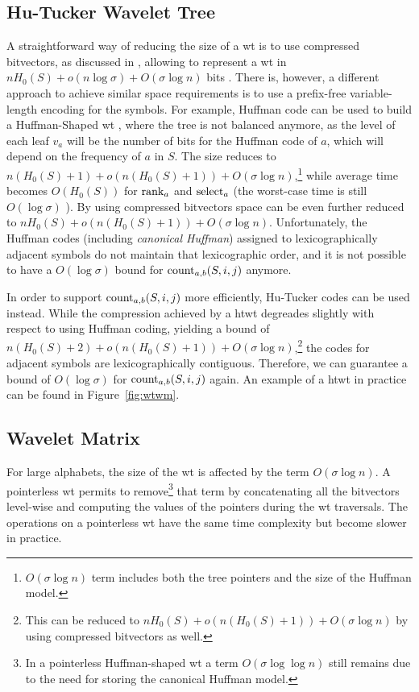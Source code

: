 \documentclass[a4paper,10pt,twoside]{book}
\begin{document}
    \subsection{Hu-Tucker Wavelet Tree}
    A straightforward way of reducing the size of a \gls{wt} is to use compressed bitvectors, as discussed in \cite{CNspire08.1}, allowing to represent a \gls{wt} in $nH_0(S) + o(n\log\sigma) + O(\sigma\log n)$ bits \cite{WT03}. There is, however, a different approach to achieve similar space requirements is to use a prefix-free variable-length encoding for the symbols.
    For example, Huffman code \cite{huffman1952method} can be used to build a
    Huffman-Shaped \gls{wt} \cite{ferragina2009compressed}, where the tree is not balanced
    anymore, as the level of each leaf $v_a$ will be the number of bits for the Huffman code of $a$, which will depend on the frequency of $a$ in $S$. The size reduces to $n(H_0(S)+1)+ o(n(H_0(S)+1)) +  O(\sigma \log n)$,\footnote{$O(\sigma \log n)$ term 
    includes both the tree pointers and the size of the Huffman model.} while average time becomes
    $O(H_0(S))$ for $\operatorname{rank}_a$ and $\operatorname{select}_a$  (the worst-case time is still $O(\log\sigma)$ 
    \cite{Barbay:2013:CPA:2562345.2562626}). By using compressed
    bitvectors \cite{CNspire08.1} space can be even further reduced to $nH_0(S) + o(n(H_0(S)+1)) +  O(\sigma \log n)$.
    Unfortunately, the Huffman codes (including \textit{canonical Huffman}) assigned to
    lexicographically adjacent symbols do not maintain that lexicographic order, and it is not possible to have a $O(\log\sigma)$ bound for $\operatorname{count}_{a,b}(S,i,j)$ anymore.
	
	In order to support $\operatorname{count}_{a,b}(S,i,j)$ more efficiently, Hu-Tucker codes \cite{hu1971optimal} can be used instead. While the compression achieved by a \gls{htwt} \cite{barbay2009compressed} degreades slightly with respect to using Huffman coding, yielding a bound of $n(H_0(S)+2) + o(n(H_0(S)+1)) +  O(\sigma \log n)$,\footnote{This can be reduced to  $nH_0(S) + o(n(H_0(S)+1)) +  O(\sigma \log n)$ by using compressed bitvectors as well.} the codes for adjacent symbols are lexicographically contiguous. Therefore, we can guarantee a bound of $O(\log\sigma)$ for $\operatorname{count}_{a,b}(S,i,j)$ again. An example of a \gls{htwt} in practice can be found in Figure~\ref{fig:wtwm}.
	
	\subsection{Wavelet Matrix}
	\label{sec:wm}
	For large alphabets, the size of the \gls{wt} is affected by the term $ O(\sigma \log n)$. A {pointerless}
    \gls{wt} \cite{CNspire08.1} permits to remove\footnote{In a pointerless Huffman-shaped \gls{wt}  a
    term $O(\sigma \log\log n)$ still remains due to the need for storing the canonical Huffman model.} 
    that term by concatenating all the bitvectors level-wise 
    and computing the values of the pointers during the \gls{wt} traversals. 
    The operations on a pointerless \gls{wt} have the same time complexity but become slower in practice. 
    
\end{document}
